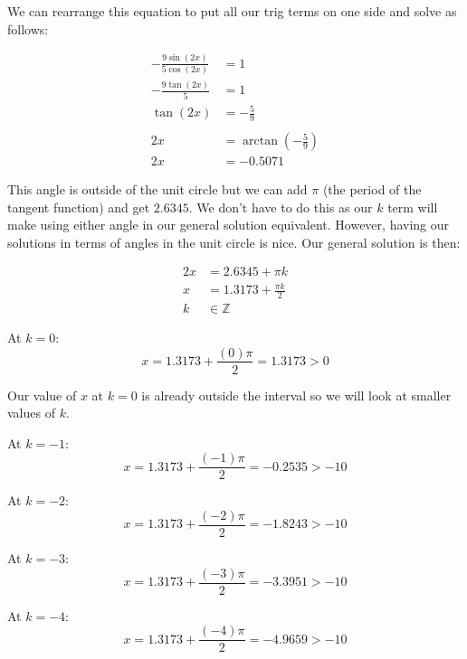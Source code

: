 \documentclass[12pt]{article}
\theoremstyle{definition}
\begin{document}
We can rearrange this equation to put all our trig terms on one side and solve as follows:

\begin{align}
    -\frac{9\sin(2x)}{5\cos(2x)} & = 1                                \\
    -\frac{9\tan(2x)}{5}         & = 1                                \\
    \tan(2x)                     & = -\frac{5}{9}                     \\
    \nonumber                                                         \\
    2x                           & = \arctan\left(-\frac{5}{9}\right) \\
    2x                           & = -0.5071
\end{align}

This angle is outside of the unit circle but we can add $\pi$ (the period of the tangent function) and get $2.6345$.
We don't have to do this as our $k$ term will make using either angle in our general solution equivalent.
However, having our solutions in terms of angles in the unit circle is nice.
Our general solution is then:

\begin{align}
    2x & = 2.6345 + \pi k           \\
    x  & = 1.3173 + \frac{\pi k}{2} \\
    k  & \in \mathbb{Z}
\end{align}

At $k=0$:
\begin{equation}
    x = 1.3173 + \frac{(0)\pi}{2} = 1.3173 > 0
\end{equation}

Our value of $x$ at $k=0$ is already outside the interval so we will look at smaller values of $k$.

At $k=-1$:
\begin{equation}
    x = 1.3173 + \frac{(-1)\pi}{2} = -0.2535 > -10
\end{equation}

At $k=-2$:
\begin{equation}
    x = 1.3173 + \frac{(-2)\pi}{2} = -1.8243 > -10
\end{equation}

At $k=-3$:
\begin{equation}
    x = 1.3173 + \frac{(-3)\pi}{2} = -3.3951 > -10
\end{equation}

At $k=-4$:
\begin{equation}
    x = 1.3173 + \frac{(-4)\pi}{2} = -4.9659 > -10
\end{equation}
\end{document}
